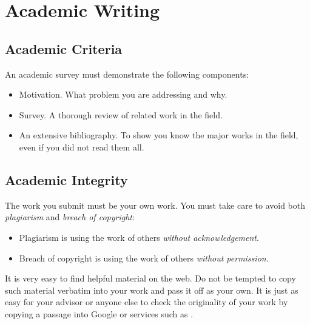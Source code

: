 %
%
% 
% 
% 


\chapter{Academic Writing}

\label{chap:Academic}



\section{Academic Criteria}

An academic survey must demonstrate the following components:
\begin{itemize}
\item Motivation. What problem you are addressing and why.

\item Survey. A thorough review of related work in the field.

\item An extensive bibliography. To show you know the major works
in the field, even if you did not read them all.
\end{itemize}




\section{Academic Integrity}

The work you submit must be your own work. You must take care to avoid
both \emph{plagiarism} and \emph{breach of copyright}:
\begin{itemize}
\item Plagiarism is using the work of others \emph{without acknowledgement}.

\item Breach of copyright is using the work of others
  \emph{without permission}.
\end{itemize}

It is very easy to find helpful material on the web. Do not be
tempted to copy such material verbatim into your work and pass it off
as your own. It is just as easy for your advisor or anyone else to
check the originality of your work by copying a passage into Google or
services such as \citep{PlagiarismOrg}.

